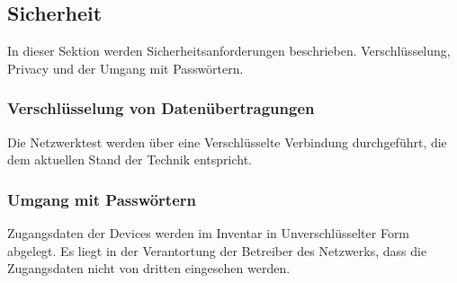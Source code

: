 \documentclass[
	ngerman,
	toc=listof, %
	toc=bibliography, %
	footnotes=multiple, %
	parskip=half, %
	numbers=noendperiod %
]{scrartcl}
\begin{document}
	\subsection{Sicherheit}
	In dieser Sektion werden Sicherheitsanforderungen beschrieben. 
	Verschlüsselung, Privacy und der Umgang mit Passwörtern.

		\subsubsection{Verschlüsselung von Datenübertragungen}
		Die Netzwerktest werden über eine Verschlüsselte Verbindung durchgeführt, die dem aktuellen Stand der Technik entspricht.

		\subsubsection{Umgang mit Passwörtern}
		Zugangsdaten der Devices werden im Inventar in Unverschlüsselter Form abgelegt. Es liegt in der Verantortung der Betreiber des Netzwerks, dass die Zugangsdaten nicht von dritten eingesehen werden.
\end{document}
